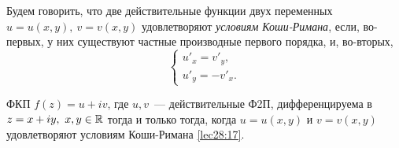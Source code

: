 \documentclass[../../main.tex]{subfiles}
\begin{document}
Будем говорить, что две действительные функции двух переменных
$u = u(x, y),\ v = v(x, y)$ удовлетворяют \emph{условиям Коши-Римана},
если, во-первых, у них существуют частные производные первого порядка,
и, во-вторых,
\begin{equation}
\label{lec28:17}
\begin{cases}
	u'_x = v'_y, \\
	u'_y = -v'_x.
\end{cases}
\end{equation}
\begin{thm}
	ФКП $f(z) = u + i v$, где $u, v$~--- действительные Ф2П, дифференцируема
	в $z = x + i y,\ x, y \in \mathbb{R}$ тогда и только тогда, когда
	$u = u(x, y)$ и $v = v(x, y)$ удовлетворяют условиям Коши-Римана 
	\eqref{lec28:17}.
\end{thm}
\end{document}
